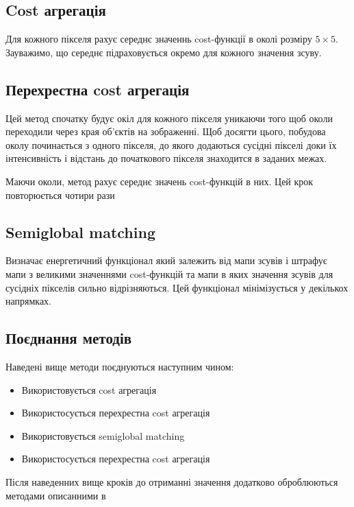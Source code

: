 \documentclass{article}
\theoremstyle{definition}
\begin{document}
\subsection{Cost агрегація}
Для кожного пікселя рахує середнє значеннь cost-функції в околі розміру $5 \times 5$. Зауважимо, що середнє підраховується окремо для кожного значення зсуву.

\subsection{Перехрестна cost агрегація}
Цей метод спочатку будує окіл для кожного пікселя уникаючи того щоб околи переходили через края об'єктів на зображенні. Щоб досягти цього,  побудова околу починається з одного пікселя, до якого додаються сусідні пікселі доки їх інтенсивність і відстань до початкового пікселя знаходится в заданих межах.

Маючи околи, метод рахує середнє значень cost-функцій в них. Цей крок повторюється чотири рази

\subsection{Semiglobal matching}
Визначає енергетичний функціонал який залежить від мапи зсувів і штрафує мапи з великими значеннями cost-функцій та мапи в яких значення зсувів для сусідніх пікселів сильно відрізняються. Цей функціонал мінімізується у декількох напрямках.

\subsection{Поєднання методів}
Наведені вище методи поєднуються наступним чином:
\begin{itemize}
	\item Використовується cost агрегація
	\item Використосується перехрестна cost агрегація
	\item Використовується semiglobal matching
	\item Використосується перехрестна cost агрегація
\end{itemize}

Після наведенних вище кроків до отриманні значення додатково оброблюються методами описанними в \cite{zbontar2016stereo}
\end{document}
